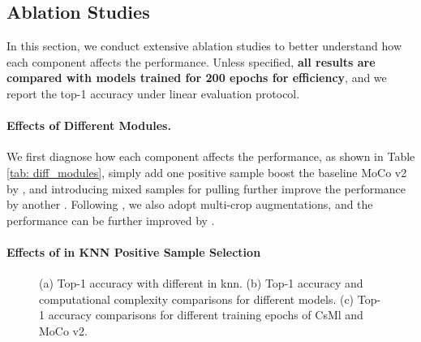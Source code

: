 \documentclass[10pt,twocolumn,letterpaper]{article}
\begin{document}
\subsection{Ablation Studies}
In this section, we conduct extensive ablation studies to better understand how each component affects the performance. Unless specified, \textbf{all results are compared with models trained for 200 epochs for efficiency}, and we report the top-1 accuracy under linear evaluation protocol.
\vspace{-0.1in}
\paragraph{Effects of Different Modules.} We first diagnose how each component affects the performance, as shown in Table \ref{tab: diff_modules}, simply add one positive sample  boost the baseline MoCo v2 by , and introducing mixed samples for pulling further improve the performance by another . Following \cite{caron2020unsupervised}, we also adopt multi-crop augmentations, and the performance can be further improved by .

\vspace{-0.15in}
\paragraph{Effects of  in KNN Positive Sample Selection}









\begin{figure*}
\centering
{}
    \caption{(a) Top-1 accuracy with different  in knn. (b) Top-1 accuracy and computational complexity comparisons for different models. (c) Top-1 accuracy comparisons for different training epochs of CsMl and MoCo v2.}

\end{figure*}
\end{document}
